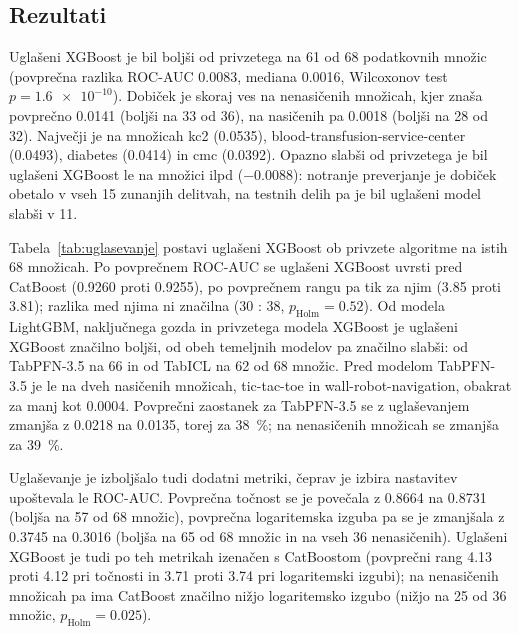 \documentclass[a4paper,12pt,openright]{book}
\begin{document}
\subsection{Rezultati}

Uglašeni XGBoost je bil boljši od privzetega na 61 od 68 podatkovnih množic
(povprečna razlika ROC-AUC \num{0.0083}, mediana \num{0.0016}, Wilcoxonov test
$p = \num{1.6e-10}$). Dobiček je skoraj ves na nenasičenih množicah, kjer znaša
povprečno \num{0.0141} (boljši na 33 od 36), na nasičenih pa \num{0.0018} (boljši
na 28 od 32). Največji je na množicah kc2 (\num{0.0535}),
blood-transfusion-service-center (\num{0.0493}), diabetes (\num{0.0414}) in cmc
(\num{0.0392}). Opazno slabši od privzetega je bil uglašeni XGBoost le na
množici ilpd (\num{-0.0088}): notranje preverjanje je dobiček obetalo v vseh 15
zunanjih delitvah, na testnih delih pa je bil uglašeni model slabši v 11.



Tabela~\ref{tab:uglasevanje} postavi uglašeni XGBoost ob privzete algoritme na
istih 68 množicah. Po povprečnem ROC-AUC se uglašeni XGBoost uvrsti pred
CatBoost (\num{0.9260} proti \num{0.9255}), po povprečnem rangu pa tik za njim
(\num{3.85} proti \num{3.81}); razlika med njima ni značilna (30 : 38,
$p_\mathrm{Holm} = \num{0.52}$). Od modela LightGBM, naključnega gozda in
privzetega modela XGBoost je uglašeni XGBoost značilno boljši, od obeh
temeljnih modelov pa značilno slabši: od TabPFN-3.5 na 66 in od TabICL na 62 od
68 množic. Pred modelom TabPFN-3.5 je le na dveh nasičenih množicah,
tic-tac-toe in wall-robot-navigation, obakrat za manj kot \num{0.0004}.
Povprečni zaostanek za TabPFN-3.5 se z uglaševanjem zmanjša z \num{0.0218} na
\num{0.0135}, torej za \SI{38}{\percent}; na nenasičenih množicah se zmanjša za
\SI{39}{\percent}.

Uglaševanje je izboljšalo tudi dodatni metriki, čeprav je izbira nastavitev
upoštevala le ROC-AUC. Povprečna točnost se je povečala z \num{0.8664} na
\num{0.8731} (boljša na 57 od 68 množic), povprečna logaritemska izguba pa se je
zmanjšala z \num{0.3745} na \num{0.3016} (boljša na 65 od 68 množic in na vseh
36 nenasičenih). Uglašeni XGBoost je tudi po teh metrikah izenačen s
CatBoostom (povprečni rang \num{4.13} proti \num{4.12} pri točnosti in
\num{3.71} proti \num{3.74} pri logaritemski izgubi); na nenasičenih množicah pa
ima CatBoost značilno nižjo logaritemsko izgubo (nižjo na 25 od 36 množic,
$p_\mathrm{Holm} = \num{0.025}$).
\end{document}
